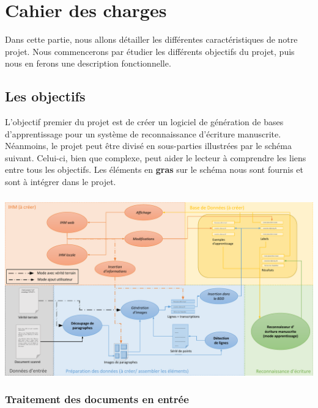 \hypertarget{c4}{\chapter{Cahier des charges}}

Dans cette partie, nous allons détailler les différentes caractéristiques de notre projet.
Nous commencerons par étudier les différents objectifs du projet, puis nous en ferons
une description fonctionnelle.

\section{Les objectifs}

L’objectif premier du projet est de créer un logiciel de génération de bases d’apprentissage
pour un système de reconnaissance d’écriture manuscrite. Néanmoins, le projet peut être divisé
en sous-parties illustrées par le schéma suivant. Celui-ci, bien que complexe, peut aider le
lecteur à comprendre les liens entre tous les objectifs. Les éléments en \textbf{gras} sur le
schéma nous sont fournis et sont à intégrer dans le projet.

\paragraph{}
\begin{mdframed}[frametitle={Figure 2 : Schéma résumant les différents aspects du projet}, innerbottommargin=10]
\begin{center}
\includegraphics[width=\linewidth]{schema.pdf}
\end{center}
\end{mdframed}

\subsection{Traitement des documents en entrée}

